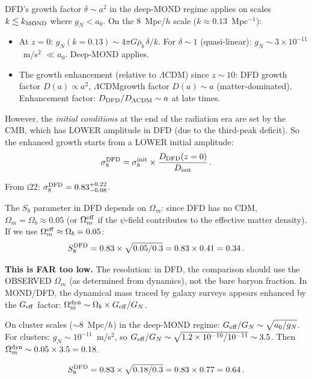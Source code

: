 \documentclass[11pt]{article}
\newcommand{\ee}[1]{\times 10^{#1}}
\newcommand{\LCDM}{$\Lambda$CDM}
\newcommand{\Geff}{G_{\rm eff}}
\newcommand{\aM}{a_0}
\newcommand{\rhob}{\bar{\rho}_b}
\newcommand{\Ob}{\Omega_b}
\newcommand{\Om}{\Omega_m}
\begin{document}
DFD's growth factor $\delta \sim a^2$ in the deep-MOND regime applies
on scales $k \lesssim k_{\rm MOND}$ where $g_N < \aM$.  On the 8~Mpc/$h$
scale ($k \approx 0.13$~Mpc$^{-1}$):
\begin{itemize}
\item At $z = 0$: $g_N(k=0.13) \sim 4\pi G\rhob\,\delta/k$.  For
  $\delta \sim 1$ (quasi-linear): $g_N \sim 3\ee{-11}$~m/s$^2$
  $\ll \aM$.  Deep-MOND applies.
\item The growth enhancement (relative to \LCDM) since $z \sim 10$:
  DFD growth factor $D(a) \propto a^2$, \LCDM growth factor
  $D(a) \sim a$ (matter-dominated).  Enhancement factor:
  $D_{\rm DFD}/D_{\Lambda\rm CDM} \sim a$ at late times.
\end{itemize}

However, the \emph{initial conditions} at the end of the radiation era
are set by the CMB, which has LOWER amplitude in DFD (due to the
third-peak deficit).  So the enhanced growth starts from a LOWER initial
amplitude:
\begin{equation}
\sigma_8^{\rm DFD} = \sigma_8^{\rm init} \times \frac{D_{\rm DFD}(z=0)}
{D_{\rm init}}\,.
\end{equation}

From i22: $\sigma_8^{\rm DFD} = 0.83^{+0.22}_{-0.08}$.

The $S_8$ parameter in DFD depends on $\Om$:  since DFD has no CDM,
$\Om = \Ob \approx 0.05$ (or $\Om^{\rm eff}$ if the $\psi$-field
contributes to the effective matter density).  If we use $\Om^{\rm eff}
\approx \Ob = 0.05$:
\begin{equation}
S_8^{\rm DFD} = 0.83 \times \sqrt{0.05/0.3} = 0.83 \times 0.41 = 0.34\,.
\end{equation}

\textbf{This is FAR too low.}  The resolution: in DFD, the comparison
should use the OBSERVED $\Om$ (as determined from dynamics), not the
bare baryon fraction.  In MOND/DFD, the dynamical mass traced by
galaxy surveys appears enhanced by the $\Geff$ factor:
$\Om^{\rm dyn} \sim \Ob \times \Geff/G_N$.

On cluster scales ($\sim 8$~Mpc/$h$) in the deep-MOND regime:
$\Geff/G_N \sim \sqrt{\aM/g_N}$.  For clusters: $g_N \sim 10^{-11}$~m/s$^2$,
so $\Geff/G_N \sim \sqrt{1.2\ee{-10}/10^{-11}} \sim 3.5$.
Then $\Om^{\rm dyn} \sim 0.05 \times 3.5 = 0.18$.

\begin{equation}
S_8^{\rm DFD} = 0.83 \times \sqrt{0.18/0.3} = 0.83 \times 0.77 = 0.64\,.
\end{equation}
\end{document}
